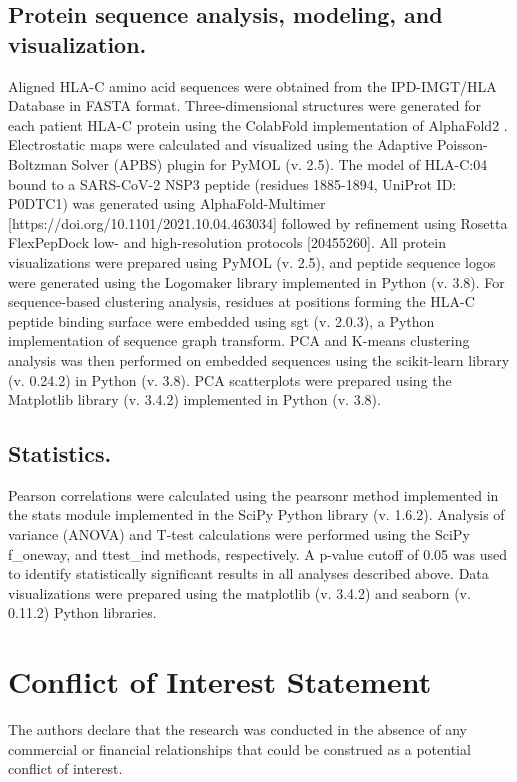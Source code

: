 \documentclass[utf8]{frontiersinFPHY_FAMS} %
\begin{document}
\subsection*{Protein sequence analysis, modeling, and visualization.} Aligned HLA-C amino acid sequences were obtained from the IPD-IMGT/HLA Database \citep{31667505} in FASTA format. Three-dimensional structures were generated for each patient HLA-C protein using the ColabFold \citep{35637307} implementation of AlphaFold2 \citep{34265844}. Electrostatic maps were calculated and visualized using the Adaptive Poisson-Boltzman Solver (APBS) plugin for PyMOL (v. 2.5). The model of HLA-C:04 bound to a SARS-CoV-2 NSP3 peptide (residues 1885-1894, UniProt ID: P0DTC1) was generated using AlphaFold-Multimer [https://doi.org/10.1101/2021.10.04.463034] followed by refinement using Rosetta FlexPepDock low- and high-resolution protocols [20455260]. All protein visualizations were prepared using PyMOL (v. 2.5), and peptide sequence logos were generated using the Logomaker library implemented in Python (v. 3.8). For sequence-based clustering analysis, residues at positions forming the HLA-C peptide binding surface were embedded using sgt (v. 2.0.3), a Python implementation of sequence graph transform. PCA and K-means clustering analysis was then performed on embedded sequences using the scikit-learn library (v. 0.24.2) in Python (v. 3.8). PCA scatterplots were prepared using the Matplotlib library (v. 3.4.2) implemented in Python (v. 3.8).

\subsection*{Statistics.} Pearson correlations were calculated using the pearsonr method implemented in the stats module implemented in the SciPy Python library (v. 1.6.2). Analysis of variance (ANOVA) and T-test calculations were performed using the SciPy f\_oneway, and ttest\_ind methods, respectively. A p-value cutoff of 0.05 was used to identify statistically significant results in all analyses described above. Data visualizations were prepared using the matplotlib (v. 3.4.2) and seaborn (v. 0.11.2) Python libraries. 

\section*{Conflict of Interest Statement}
The authors declare that the research was conducted in the absence of any commercial or financial relationships that could be construed as a potential conflict of interest.
\end{document}
